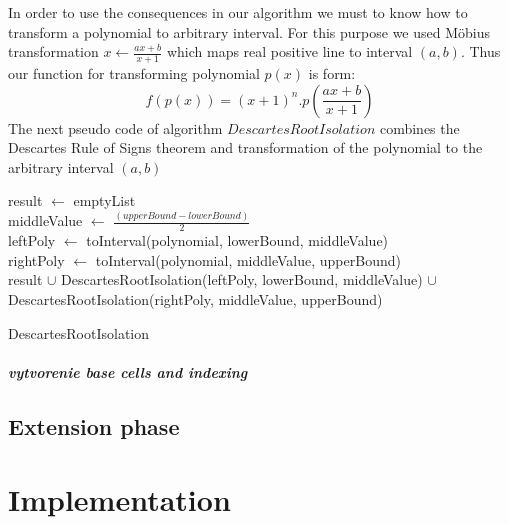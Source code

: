 \documentclass[
  digital, %
  twoside, %
  table,   %
  nolof,     %
  nolot,     %
]{fithesis3}
\begin{document}
In order to use the consequences in our algorithm we must to know how to transform a polynomial to arbitrary interval.
For this purpose we used Möbius transformation $x \gets \frac{ax + b}{x+1}$  which maps real positive line to interval $(a, b)$. \cite{DBLP:journals/corr/abs-1109-6279} Thus our function for transforming polynomial $p(x)$ is form: 
\begin{equation}
    f(p(x)) =  (x + 1)^n . p(\frac{ax + b}{x+1})
\end{equation}
The next pseudo code of algorithm $DescartesRootIsolation$ combines the  Descartes Rule of Signs theorem and transformation of the polynomial to the arbitrary interval $(a, b)$


\begin{algorithm}[H]
    
 result $\gets$ emptyList\\
 middleValue $\gets$ $\frac{(upperBound - lowerBound)}{2}$\\
 leftPoly $\gets$ toInterval(polynomial, lowerBound, middleValue)\\
 rightPoly $\gets$ toInterval(polynomial, middleValue, upperBound)\\
 \Return result $\cup$
 \newline
 DescartesRootIsolation(leftPoly, lowerBound, middleValue) $\cup$
 \newline
 DescartesRootIsolation(rightPoly, middleValue, upperBound)
 \caption{DescartesRootIsolation}
\end{algorithm}

\paragraph{
vytvorenie base cells and indexing
}
\section{Extension phase}

\chapter{Implementation}
\end{document}
